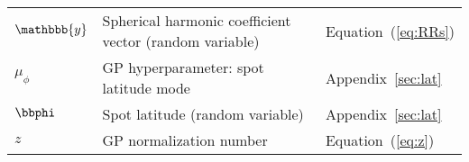 \begin{center}
\begin{longtable}{W{c}{1cm} W{l}{9cm} W{l}{2cm}}
        $\mathbbb{y}$
         & Spherical harmonic coefficient vector (random variable)
         & Equation~(\ref{eq:RRs})
        \\
        $\mu_\phi$
         & GP hyperparameter: spot latitude mode
         & Appendix~\ref{sec:lat}
        \\
        $\bbphi$
         & Spot latitude (random variable)
         & Appendix~\ref{sec:lat}
        \\
        $z$
         & GP normalization number
         & Equation~(\ref{eq:z})
        \\
    \end{longtable}
\end{center}
